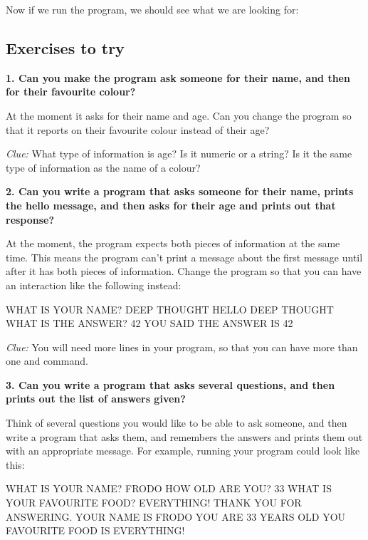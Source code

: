 \needspace{4cm}
Now if we run the program, we should see what we are looking for:


  \subsection{Exercises to try}

  {\bf 1. Can you make the program ask someone for their name, and
    then for their favourite colour?}

  At the moment it asks for their name and age. Can you change the
  program so that it reports on their favourite colour instead of
  their age?

  {\em Clue:} What type of information is age? Is it numeric or a
  string? Is it the same type of information as the name of a colour?

  {\bf 2. Can you write a program that asks someone for their name,
    prints the hello message, and then asks for their age and prints
    out that response?}

  \needspace{2cm}
  At the moment, the program expects both pieces of information at
  the same time. This means the program can't print a message about
  the first message until after it has both pieces of information.
  Change the program so that you can have an interaction like the
  following instead:

\begin{screenoutput}
WHAT IS YOUR NAME? DEEP THOUGHT
HELLO DEEP THOUGHT
WHAT IS THE ANSWER? 42
YOU SAID THE ANSWER IS 42
\end{screenoutput}

{\em Clue:} You will need more lines in your program, so that you
can have more than one  and  command.

{\bf 3. Can you write a program that asks several questions, and
  then prints out the list of answers given?}

\needspace{2cm}
Think of several questions you would like to be able to ask someone,
and then write a program that asks them, and remembers the answers
and prints them out with an appropriate message. For example, running
your program could look like this:

\begin{screenoutput}
  WHAT IS YOUR NAME? FRODO
  HOW OLD ARE YOU? 33
  WHAT IS YOUR FAVOURITE FOOD? EVERYTHING!
  THANK YOU FOR ANSWERING.
  YOUR NAME IS FRODO
  YOU ARE 33 YEARS OLD
  YOU FAVOURITE FOOD IS EVERYTHING!
\end{screenoutput}

